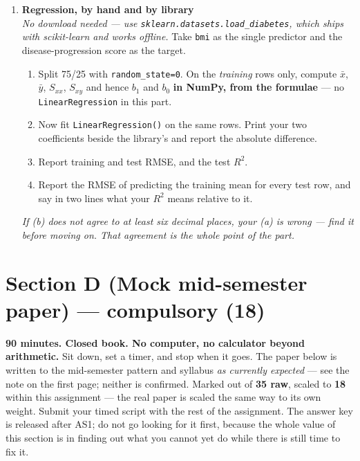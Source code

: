 \documentclass[11pt,a4paper]{article}
\begin{document}
\begin{enumerate}[label=\textbf{C\arabic*.}, leftmargin=*]
  \item \textbf{Regression, by hand and by library} \\
    \emph{No download needed --- use \texttt{sklearn.datasets.load\_diabetes},
    which ships with scikit-learn and works offline.} Take \texttt{bmi} as the
    single predictor and the disease-progression score as the target.
    \begin{enumerate}[label=(\alph*), leftmargin=*]
      \item Split 75/25 with \texttt{random\_state=0}. On the \emph{training}
        rows only, compute $\bar x$, $\bar y$, $S_{xx}$, $S_{xy}$ and hence
        $b_1$ and $b_0$ \textbf{in NumPy, from the formulae} --- no
        \texttt{LinearRegression} in this part. 
      \item Now fit \texttt{LinearRegression()} on the same rows. Print your
        two coefficients beside the library's and report the absolute
        difference. 
      \item Report training and test RMSE, and the test $R^2$. 
      \item Report the RMSE of predicting the training mean for every test row,
        and say in two lines what your $R^2$ means relative to it. 
    \end{enumerate}
    \emph{If (b) does not agree to at least six decimal places, your (a) is
    wrong --- find it before moving on. That agreement is the whole point of
    the part.}

\end{enumerate}

\section*{Section D (Mock mid-semester paper) --- compulsory \quad (18)}

\begin{warnbox}
\textbf{90 minutes. Closed book. No computer, no calculator beyond arithmetic.}
Sit down, set a timer, and stop when it goes. The paper below is written to the
mid-semester pattern and syllabus \emph{as currently expected} --- see the note
on the first page; neither is confirmed. Marked out of \textbf{35 raw},
scaled to \textbf{18} within this assignment --- the real paper is scaled the same
way to its own weight. Submit your timed script with the rest of the assignment. The answer
key is released after AS1; do not go looking for it first, because the whole
value of this section is in finding out what you cannot yet do while there is
still time to fix it.
\end{warnbox}
\end{document}
